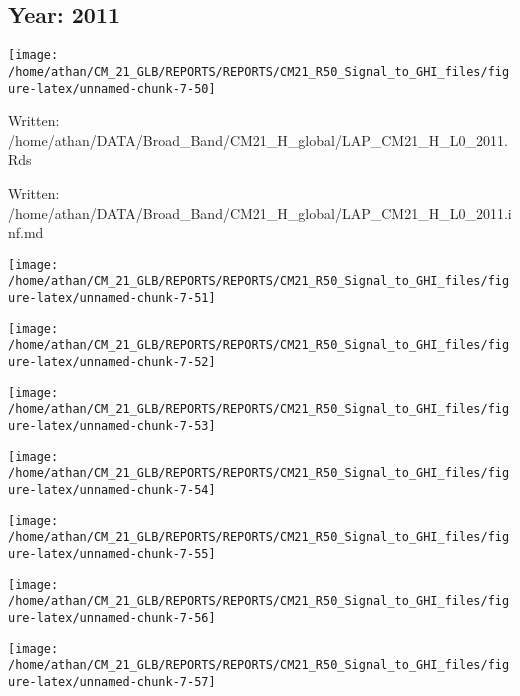 \documentclass[
  11pt,
  a4paper,oneside]{article}
\begin{document}
\newpage

\hypertarget{year-2011}{%
\subsection{Year: 2011}\label{year-2011}}

\begin{center}\texttt{[image: /home/athan/CM\_21\_GLB/REPORTS/REPORTS/CM21\_R50\_Signal\_to\_GHI\_files/figure-latex/unnamed-chunk-7-50]} \end{center}

Written: /home/athan/DATA/Broad\_Band/CM21\_H\_global/LAP\_CM21\_H\_L0\_2011.Rds

Written: /home/athan/DATA/Broad\_Band/CM21\_H\_global/LAP\_CM21\_H\_L0\_2011.inf.md

\begin{center}\texttt{[image: /home/athan/CM\_21\_GLB/REPORTS/REPORTS/CM21\_R50\_Signal\_to\_GHI\_files/figure-latex/unnamed-chunk-7-51]} \end{center}

\begin{center}\texttt{[image: /home/athan/CM\_21\_GLB/REPORTS/REPORTS/CM21\_R50\_Signal\_to\_GHI\_files/figure-latex/unnamed-chunk-7-52]} \end{center}

\begin{center}\texttt{[image: /home/athan/CM\_21\_GLB/REPORTS/REPORTS/CM21\_R50\_Signal\_to\_GHI\_files/figure-latex/unnamed-chunk-7-53]} \end{center}

\begin{center}\texttt{[image: /home/athan/CM\_21\_GLB/REPORTS/REPORTS/CM21\_R50\_Signal\_to\_GHI\_files/figure-latex/unnamed-chunk-7-54]} \end{center}

\begin{center}\texttt{[image: /home/athan/CM\_21\_GLB/REPORTS/REPORTS/CM21\_R50\_Signal\_to\_GHI\_files/figure-latex/unnamed-chunk-7-55]} \end{center}

\begin{center}\texttt{[image: /home/athan/CM\_21\_GLB/REPORTS/REPORTS/CM21\_R50\_Signal\_to\_GHI\_files/figure-latex/unnamed-chunk-7-56]} \end{center}

\begin{center}\texttt{[image: /home/athan/CM\_21\_GLB/REPORTS/REPORTS/CM21\_R50\_Signal\_to\_GHI\_files/figure-latex/unnamed-chunk-7-57]} \end{center}
\end{document}
